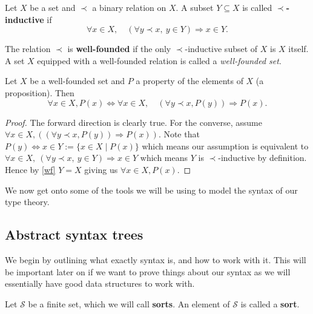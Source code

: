 \begin{defin}
    Let $X$ be a set and $\prec$ a binary relation on $X$. A subset $Y \subseteq X$ is called \textbf{$\prec$-inductive} if
    $$
        \forall x \in X, \quad (\forall y \prec x,\ y \in Y) \Rightarrow x \in Y.
    $$
\end{defin}

\begin{defin}\label{wf}
    The relation $\prec$ is \textbf{well-founded} if the only $\prec$-inductive subset of $X$ is $X$ itself. A set $X$ equipped with a well-founded relation is called a \textit{well-founded set}.
\end{defin}

\begin{theorem}
    Let $X$ be a well-founded set and $P$ a property of the elements of $X$ (a proposition). Then
    $$
        \forall x \in X, P(x) \Leftrightarrow \forall x \in X,\quad (\forall y \prec x, P(y)) \Rightarrow P(x).
    $$
\end{theorem}
\begin{proof}
    The forward direction is clearly true. For the converse, assume $\forall x \in X,((\forall y \prec x, P(y)) \Rightarrow P(x))$. Note that $P(y) \Leftrightarrow x \in Y := \{ x \in X \mid P(x)\} $ which means our assumption is equivalent to $\forall x \in X,\ (\forall y \prec x,\ y \in Y) \Rightarrow x \in Y$ which means $Y$ is $\prec$-inductive by definition. Hence by \ref{wf} $Y=X$ giving us $ \forall x \in X, P(x)$.
\end{proof}

We now get onto some of the tools we will be using to model the syntax of our type theory. 

\subsection{Abstract syntax trees}

We begin by outlining what exactly syntax is, and how to work with it. This will be important later on if we want to prove things about our syntax as we will essentially have good data structures to work with.


\begin{defin}[Sorts]
    Let $\mathcal{S}$ be a finite set, which we will call \textbf{sorts}. An element of $\mathcal{S}$ is called a \textbf {sort}.
\end{defin}

